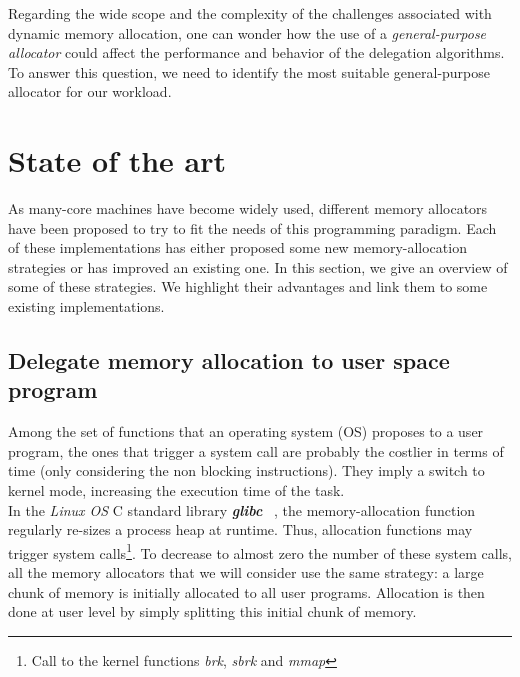 \documentclass[10pt]{article}											%
\begin{document}
Regarding the wide scope and the complexity of the challenges associated with dynamic memory allocation, one can wonder how the use of a \textit{general-purpose allocator} could affect the performance and behavior of the delegation algorithms.   To answer this question, we need to identify the most suitable general-purpose allocator for our workload.







\section{State of the art}\label{stateOfTheArtAllocator}
As many-core machines have become widely used, different memory allocators ~\cite{glibc_robertson,hoard_berger,scalloc_aigner,supermalloc_kuszmaul,jemalloc_evans,tcmalloc_ghemawat} have been proposed to try to fit the needs of this programming paradigm.   Each of these implementations has either proposed some new memory-allocation strategies or has improved an existing one.   In this section, we give an overview of some of these strategies.  We highlight their advantages and link them to some existing implementations.



\subsection{Delegate memory allocation to user space program}
Among the set of functions that an operating system (OS) proposes to a user program, the ones that trigger a system call are probably the costlier in terms of time (only considering the non blocking instructions).   They imply a switch to kernel mode, increasing the execution time of the task.\\

In the \textit{Linux OS} C standard library \textbf{\textit{glibc}} ~\cite{glibc_robertson}, the memory-allocation function regularly re-sizes a process heap at runtime.  Thus, allocation functions may trigger system calls\footnote{Call to the kernel functions \textit{brk}, \textit{sbrk} and \textit{mmap}}.   To decrease to almost zero the number of these system calls, all the memory allocators that we will consider use the same strategy: a large chunk of memory is initially allocated to all user programs.   Allocation is then done at user level by simply splitting this initial chunk of memory.
\end{document}
